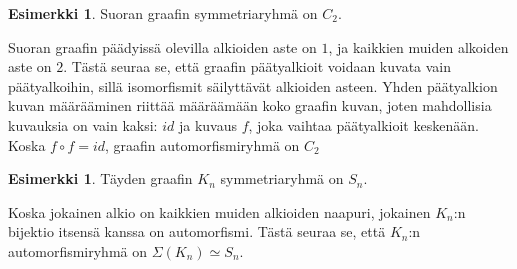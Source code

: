 \documentclass[a4paper, 12pt]{article}
\theoremstyle{definition}
\newtheorem{example}[mydef]{Esimerkki}
\theoremstyle{plain}
\begin{document}
\begin{example}
Suoran graafin symmetriaryhmä on $C_2$.

\begin{center}
\end{center}

Suoran graafin päädyissä olevilla alkioiden aste on $1$, ja kaikkien muiden alkoiden aste on $2$. Tästä seuraa se, että graafin päätyalkioit voidaan kuvata vain päätyalkoihin, sillä isomorfismit säilyttävät alkioiden asteen. Yhden päätyalkion kuvan määrääminen riittää määräämään koko graafin kuvan, joten mahdollisia kuvauksia on vain kaksi: $id$ ja kuvaus $f$, joka vaihtaa päätyalkioit keskenään. Koska $f \circ f = id$, graafin automorfismiryhmä on $C_2$
\end{example}

\begin{example}
Täyden graafin $K_n$ symmetriaryhmä on $S_n$.

\begin{center}
\end{center}

Koska jokainen alkio on kaikkien muiden alkioiden naapuri, jokainen $K_n$:n bijektio itsensä kanssa on automorfismi. Tästä seuraa se, että $K_n$:n automorfismiryhmä on $\Sigma(K_n) \simeq S_n$.
\end{example}
\end{document}
